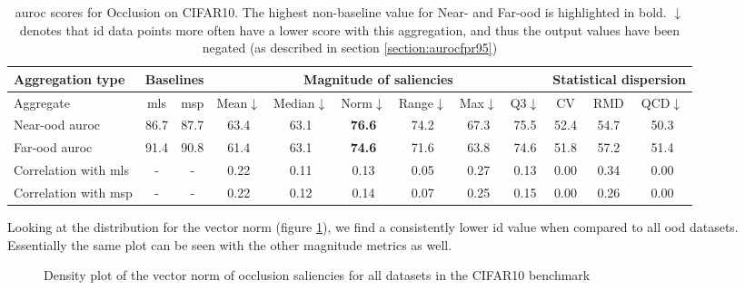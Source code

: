 \documentclass[UKenglish]{uiomasterthesis} %
\theoremstyle{definition}
\begin{document}
\begin{table}[H]
\setlength\tabcolsep{3pt}
\begin{center}
\begin{tabular}{ |p{5.1em}|c c|c c c c c c|c c c| }
    \hline
     \centering Aggregation type & \multicolumn{2}{c|}{Baselines} & \multicolumn{6}{c|}{Magnitude of saliencies} & \multicolumn{3}{p{8em}|}{\centering Statistical dispersion} \\
    \hline
    Aggregate & \ac{mls} & \ac{msp} & Mean$\downarrow$ & Median$\downarrow$ & Norm$\downarrow$ & Range$\downarrow$ & Max$\downarrow$ & Q3$\downarrow$ & CV & RMD & QCD$\downarrow$  \\
    \hline
    \rowcolor{near!50}
    Near-\ac{ood} \ac{auroc} & 86.7 & 87.7 & 63.4 & 63.1 &\textbf{ 76.6 }& 74.2 & 67.3 & 75.5 & 52.4 & 54.7 & 50.3  \\
    \hline
    \rowcolor{far!50}
    Far-\ac{ood} \ac{auroc} & 91.4 & 90.8 & 61.4 & 63.1 &\textbf{ 74.6 }& 71.6 & 63.8 & 74.6 & 51.8 & 57.2 & 51.4  \\
    \hline
    Correlation with \ac{mls}& - & - & 0.22 & 0.11 & 0.13 & 0.05 & 0.27 & 0.13 & 0.00 & 0.34 & 0.00  \\
    \hline
    Correlation with \ac{msp}& - & - & 0.22 & 0.12 & 0.14 & 0.07 & 0.25 & 0.15 & 0.00 & 0.26 & 0.00  \\
    \hline
    \end{tabular}
    \caption[\ac{auroc} scores for Occlusion on CIFAR10]{\ac{auroc} scores for Occlusion on CIFAR10. The highest non-baseline value for Near- and Far-\ac{ood} is highlighted in bold. $\downarrow$ denotes that \ac{id} data points more often have a lower score with this aggregation, and thus the output values have been negated (as described in section \ref{section:aurocfpr95})}
    \label{table:cifar10_occlusion_metrics}
\end{center}
\setlength\tabcolsep{6pt}
\end{table}

Looking at the distribution for the vector norm (figure \ref{fig:cifar10_occlusion_norm}), we find a consistently lower \ac{id} value when compared to all \ac{ood} datasets. Essentially the same plot can be seen with the other magnitude metrics as well.

\begin{figure}[H]
    \begin{center}
        
    \end{center}
    \caption[CIFAR10 occlusion vector norm density plot]{Density plot of the vector norm of occlusion saliencies for all datasets in the CIFAR10 benchmark}
    \label{fig:cifar10_occlusion_norm}
\end{figure}
\end{document}
